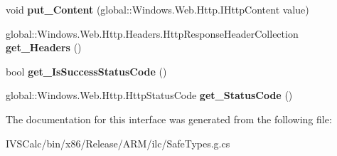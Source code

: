 \begin{DoxyCompactItemize}
void {\bfseries put\+\_\+\+Content} (global\+::\+Windows.\+Web.\+Http.\+I\+Http\+Content value)
\item 
\mbox{\label{interface_windows_1_1_web_1_1_http_1_1_i_http_response_message_a6e4729e8452970899c28bff03d1c7559}} 
global\+::\+Windows.\+Web.\+Http.\+Headers.\+Http\+Response\+Header\+Collection {\bfseries get\+\_\+\+Headers} ()
\item 
\mbox{\label{interface_windows_1_1_web_1_1_http_1_1_i_http_response_message_a51eb8ecfec42519640fcb872df413f76}} 
bool {\bfseries get\+\_\+\+Is\+Success\+Status\+Code} ()
\item 
\mbox{\label{interface_windows_1_1_web_1_1_http_1_1_i_http_response_message_a707bd9334321d44dcf0d6b634c37b9f0}} 
global\+::\+Windows.\+Web.\+Http.\+Http\+Status\+Code {\bfseries get\+\_\+\+Status\+Code} ()
\end{DoxyCompactItemize}


The documentation for this interface was generated from the following file\+:\begin{DoxyCompactItemize}
\item 
I\+V\+S\+Calc/bin/x86/\+Release/\+A\+R\+M/ilc/Safe\+Types.\+g.\+cs\end{DoxyCompactItemize}
